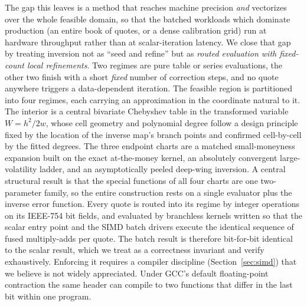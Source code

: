 \documentclass[11pt]{article}
\begin{document}
The gap this leaves is a method that reaches machine precision \emph{and} vectorizes over the whole feasible domain, so that the batched workloads which dominate production (an entire book of quotes, or a dense calibration grid) run at hardware throughput rather than at scalar-iteration latency. We close that gap by treating inversion not as ``seed and refine'' but as \emph{routed evaluation with fixed-count local refinements}. Two regimes are pure table or series evaluations, the other two finish with a short \emph{fixed} number of correction steps, and no quote anywhere triggers a data-dependent iteration. The feasible region is partitioned into four regimes, each carrying an approximation in the coordinate natural to it. The interior is a central bivariate Chebyshev table in the transformed variable $W=h^2/2w$, whose cell geometry and polynomial degree follow a design principle fixed by the location of the inverse map's branch points and confirmed cell-by-cell by the fitted degrees. The three endpoint charts are a matched small-moneyness expansion built on the exact at-the-money kernel, an absolutely convergent large-volatility ladder, and an asymptotically peeled deep-wing inversion. A central structural result is that the special functions of all four charts are one two-parameter family, so the entire construction rests on a single evaluator plus the inverse error function. Every quote is routed into its regime by integer operations on its IEEE-754 bit fields, and evaluated by branchless kernels written so that the scalar entry point and the SIMD batch drivers execute the identical sequence of fused multiply-adds per quote. The batch result is therefore bit-for-bit identical to the scalar result, which we treat as a correctness invariant and verify exhaustively. Enforcing it requires a compiler discipline (Section~\ref{sec:simd}) that we believe is not widely appreciated. Under GCC's default floating-point contraction the same header can compile to two functions that differ in the last bit within one program.
\end{document}
